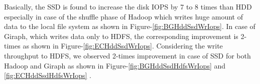\documentclass[conference]{IEEEtran}
\begin{document}
Basically, the SSD is found to increase the disk IOPS by 7 to 8 times than HDD especially in case of the shuffle phase of Hadoop which writes huge amount of data  to  the local file system as shown in Figure-\ref{fig:BGHddSsdWrIops}.
In case of Giraph, which writes data only to HDFS, the corresponding improvement is 2-times as shown in Figure-\ref{fig:ECHddSsdWrIops}.
Considering the write throughput to HDFS, we observed 2-times improvement in case of SSD for both Hadoop and Giraph as shown in Figure-\ref{fig:BGHddSsdHdfsWrIops} and  \ref{fig:ECHddSsdHdfsWrIops} . 


\end{document}
